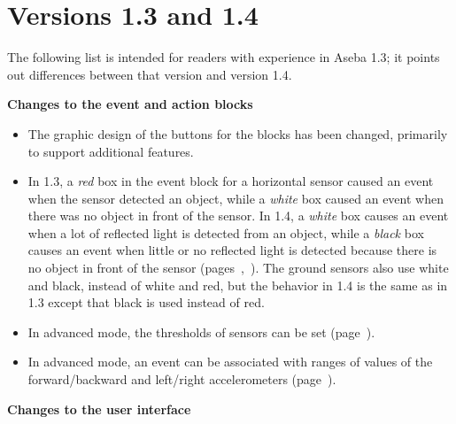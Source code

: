 
\chapter*{Versions 1.3 and 1.4}

The following list is intended for readers with experience in Aseba 1.3;
it points out differences between that version and version 1.4.

\textbf{Changes to the event and action blocks}

\begin{itemize}

\item The graphic design of the buttons for the blocks has been changed,
primarily to support additional features.

\item In 1.3, a \emph{red} box in the event block for a horizontal
sensor caused an event when the sensor detected an object, while a
\emph{white} box caused an event when there was no object in front of
the sensor. In 1.4, a \emph{white} box causes an event when a lot of
reflected light is detected from an object, while a \emph{black} box
causes an event when little or no reflected light is detected because
there is no object in front of the sensor
(pages~\pageref{p.proximity-colors1},~\pageref{p.proximity-colors2}).
The ground sensors also use white and black, instead of white and red,
but the behavior in 1.4 is the same as in 1.3 except that black is used
instead of red.


\item In advanced mode, the thresholds of sensors can be
set (page~\pageref{p.proximity-sensitivity}).

\item In advanced mode, an event can be associated with ranges of values
of the forward/backward and left/right accelerometers
(page~\pageref{p.accel}).


\end{itemize}

\textbf{Changes to the user interface}

